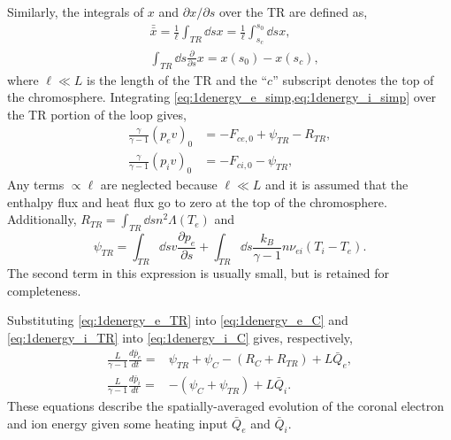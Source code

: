Similarly, the integrals of $x$ and $\partial x/\partial s$ over the TR are defined as,
\begin{align}
    &\bar{\bar{x}} = \frac{1}{\ell}\int_{TR}\dd{s}x = \frac{1}{\ell}\int_{s_c}^{s_0}\dd{s}x,\nonumber \\
    &\int_{TR}\dd{s}\frac{\partial}{\partial s}x = x(s_0) - x(s_c),\nonumber
\end{align}
where $\ell\ll L$ is the length of the TR and the ``$c$'' subscript denotes the top of the chromosphere. Integrating \cref{eq:1denergy_e_simp,eq:1denergy_i_simp} over the TR portion of the loop gives,
\begin{align}
    \frac{\gamma}{\gamma - 1}(p_ev)_0 &= - F_{ce,0} + \psi_{TR} - R_{TR}, \label{eq:1denergy_e_TR} \\
    \frac{\gamma}{\gamma - 1}(p_iv)_0 &=  - F_{ci,0} - \psi_{TR}, \label{eq:1denergy_i_TR}
\end{align}
Any terms $\propto\ell$ are neglected because $\ell\ll L$ \citep{klimchuk_highly_2008} and it is assumed that the enthalpy flux and heat flux go to zero at the top of the chromosphere. Additionally, $R_{TR}=\int_{TR}\dd{s}n^2\Lambda(T_e)$ and
\begin{equation}\label{eq:psi_tr_full}
    \psi_{TR}=\int_{TR}\dd{s}v\frac{\partial p_e}{\partial s} + \int_{TR}\dd{s}\frac{k_B}{\gamma - 1}n\nu_{ei}(T_i - T_e).
\end{equation}
The second term in this expression is usually small, but is retained for completeness.

Substituting \cref{eq:1denergy_e_TR} into \autoref{eq:1denergy_e_C} and \autoref{eq:1denergy_i_TR} into \autoref{eq:1denergy_i_C} gives, respectively,
\begin{align}
    \frac{L}{\gamma - 1}\frac{d\bar{p}_e}{dt} =& \psi_{TR} + \psi_C -(R_C + R_{TR}) + L\bar{Q}_{e},\label{eq:0d_press_e_sub} \\
    \frac{L}{\gamma - 1}\frac{d\bar{p}_i}{dt} =& -(\psi_{C} + \psi_{TR}) +  L\bar{Q}_{i}.\label{eq:0d_press_i_sub}
\end{align}
These equations describe the spatially-averaged evolution of the coronal electron and ion energy given some heating input $\bar{Q}_e$ and $\bar{Q}_i$. 

